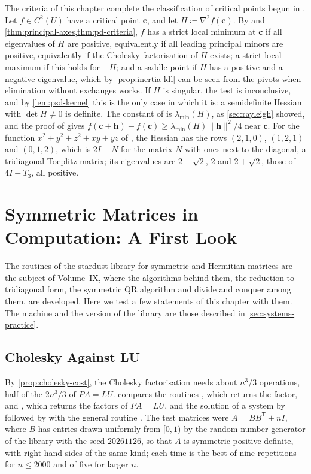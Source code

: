 The criteria of this chapter complete the classification of critical points begun in . Let $f\in C^2(U)$ have a critical point $\mathbf c$, and let $H\coloneqq\nabla^2f(\mathbf c)$. By  and \cref{thm:principal-axes,thm:pd-criteria}, $f$ has a strict local minimum at $\mathbf c$ if all eigenvalues of $H$ are positive, equivalently if all leading principal minors are positive, equivalently if the Cholesky factorisation of $H$ exists; a strict local maximum if this holds for $-H$; and a saddle point if $H$ has a positive and a negative eigenvalue, which by \cref{prop:inertia-ldl} can be seen from the pivots when elimination without exchanges works. If $H$ is singular, the test is inconclusive, and by \cref{lem:psd-kernel} this is the only case in which it is: a semidefinite Hessian with $\det H\ne0$ is definite. The constant of  is $\lambda_{\min}(H)$, as \cref{sec:rayleigh} showed, and the proof of  gives $f(\mathbf c+\mathbf h)-f(\mathbf c)\ge\lambda_{\min}(H)\|\mathbf h\|^2/4$ near $\mathbf c$. For the function $x^2+y^2+z^2+xy+yz$ of , the Hessian has the rows $(2,1,0)$, $(1,2,1)$ and $(0,1,2)$, which is $2I+N$ for the matrix $N$ with ones next to the diagonal, a tridiagonal Toeplitz matrix; its eigenvalues are $2-\sqrt2$, $2$ and $2+\sqrt2$, those of $4I-T_3$, all positive.

\section{Symmetric Matrices in Computation: A First Look}
\label{sec:symmetric-computation}

The routines of the stardust library for symmetric and Hermitian matrices are the subject of Volume~IX, where the algorithms behind them, the reduction to tridiagonal form, the symmetric QR algorithm and divide and conquer among them, are developed. Here we test a few statements of this chapter with them. The machine and the version of the library are those described in \cref{sec:systems-practice}.

\subsection{Cholesky Against LU}

By \cref{prop:cholesky-cost}, the Cholesky factorisation needs about $n^3/3$ operations, half of the $2n^3/3$ of $PA=LU$.  compares the routines , which returns the factor, and , which returns the factors of $PA=LU$, and the solution of a system by  followed by  with the general routine . The test matrices were $A=BB^{\mathsf T}+nI$, where $B$ has entries drawn uniformly from $[0,1)$ by the random number generator of the library with the seed $20261126$, so that $A$ is symmetric positive definite, with right-hand sides of the same kind; each time is the best of nine repetitions for $n\le2000$ and of five for larger $n$.

